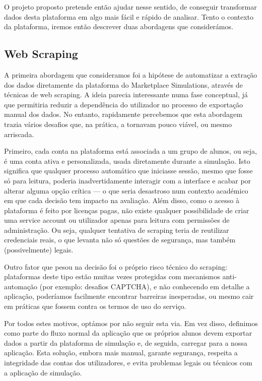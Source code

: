 O projeto proposto pretende então ajudar nesse sentido, de conseguir transformar dados desta plataforma em algo mais fácil e rápido de analisar. Tento o contexto da plataforma, iremos então descrever duas abordagens que considerámos.

\subsection{Web Scraping}
A primeira abordagem que consideramos foi a hipótese de automatizar a extração dos dados diretamente da plataforma do Marketplace Simulations, através de técnicas de web scraping. A ideia parecia interessante numa fase conceptual, já que permitiria reduzir a dependência do utilizador no processo de exportação manual dos dados. No entanto, rapidamente percebemos que esta abordagem trazia vários desafios que, na prática, a tornavam pouco viável, ou mesmo arriscada.

Primeiro, cada conta na plataforma está associada a um grupo de alunos, ou seja, é uma conta ativa e personalizada, usada diretamente durante a simulação. Isto significa que qualquer processo automático que iniciasse sessão, mesmo que fosse só para leitura, poderia inadvertidamente interagir com a interface e acabar por alterar alguma opção crítica — o que seria desastroso num contexto académico em que cada decisão tem impacto na avaliação. Além disso, como o acesso à plataforma é feito por licenças pagas, não existe qualquer possibilidade de criar uma service account ou utilizador apenas para leitura com permissões de administração. Ou seja, qualquer tentativa de scraping teria de reutilizar credenciais reais, o que levanta não só questões de segurança, mas também (possivelmente) legais.  

Outro fator que pesou na decisão foi o próprio risco técnico do scraping: plataformas deste tipo estão muitas vezes protegidas com mecanismos anti-automação (por exemplo: desafios CAPTCHA), e não conhecendo em detalhe a aplicação, poderíamos facilmente encontrar barreiras inesperadas, ou mesmo cair em práticas que fossem contra os termos de uso do serviço.

Por todos estes motivos, optámos por não seguir esta via. Em vez disso, definimos como parte do fluxo normal da aplicação que os próprios alunos devem exportar dados a partir da plataforma de simulação e, de seguida, carregar para a nossa aplicação. Esta solução, embora mais manual, garante segurança, respeita a integridade das contas dos utilizadores, e evita problemas legais ou técnicos com a aplicação de simulação.


